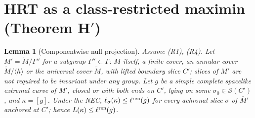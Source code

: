 \documentclass[aps,prd,onecolumn,superscriptaddress,nofootinbib,amsmath,amssymb,11pt]{revtex4-2}
\newtheorem{lemma}[theorem]{Lemma}
\theoremstyle{definition}
\newcommand{\Mbar}{\overline{M}}
\begin{document}
\section{HRT as a class-restricted maximin (Theorem H$'$)}\label{sec:Hprime}

\begin{lemma}[Componentwise null projection]\label{lem:P}
Assume (R1), (R4). Let $M'=\tilde M/\Gamma''$ for a subgroup $\Gamma''\subset\Gamma$: $M$ itself, a finite cover, an annular
cover $\tilde M/\langle h\rangle$ or the universal cover $\tilde M$, with lifted boundary slice $C'$; slices of $M'$ are not required to
be invariant under any group. Let $g$ be a \emph{simple} complete spacelike extremal curve of $M'$, closed or with both ends on
$C'$, lying on some $\sigma_0\in\mathcal S(C')$, and $\kappa=[g]$. Under the NEC, $\ell_\sigma(\kappa)\le\ell^{\rm ren}(g)$ for every
achronal slice $\sigma$ of $\Mbar'$ anchored at $C'$; hence $L(\kappa)\le\ell^{\rm ren}(g)$.
\end{lemma}
\end{document}
